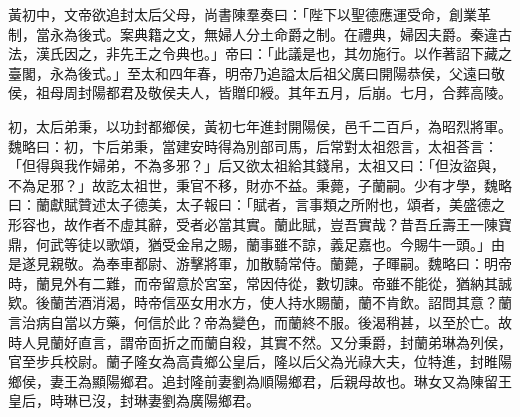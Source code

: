 \begin{pinyinscope}
黃初中，文帝欲追封太后父母，尚書陳羣奏曰：「陛下以聖德應運受命，創業革制，當永為後式。案典籍之文，無婦人分土命爵之制。在禮典，婦因夫爵。秦違古法，漢氏因之，非先王之令典也。」帝曰：「此議是也，其勿施行。以作著詔下藏之臺閣，永為後式。」至太和四年春，明帝乃追謚太后祖父廣曰開陽恭侯，父遠曰敬侯，祖母周封陽都君及敬侯夫人，皆贈印綬。其年五月，后崩。七月，合葬高陵。

初，太后弟秉，以功封都鄉侯，黃初七年進封開陽侯，邑千二百戶，為昭烈將軍。魏略曰：初，卞后弟秉，當建安時得為別部司馬，后常對太祖怨言，太祖荅言：「但得與我作婦弟，不為多邪？」后又欲太祖給其錢帛，太祖又曰：「但汝盜與，不為足邪？」故訖太祖世，秉官不移，財亦不益。秉薨，子蘭嗣。少有才學，魏略曰：蘭獻賦贊述太子德美，太子報曰：「賦者，言事類之所附也，頌者，美盛德之形容也，故作者不虛其辭，受者必當其實。蘭此賦，豈吾實哉？昔吾丘壽王一陳寶鼎，何武等徒以歌頌，猶受金帛之賜，蘭事雖不諒，義足嘉也。今賜牛一頭。」由是遂見親敬。為奉車都尉、游擊將軍，加散騎常侍。蘭薨，子暉嗣。魏略曰：明帝時，蘭見外有二難，而帝留意於宮室，常因侍從，數切諫。帝雖不能從，猶納其誠欵。後蘭苦酒消渴，時帝信巫女用水方，使人持水賜蘭，蘭不肯飲。詔問其意？蘭言治病自當以方藥，何信於此？帝為變色，而蘭終不服。後渴稍甚，以至於亡。故時人見蘭好直言，謂帝靣折之而蘭自殺，其實不然。又分秉爵，封蘭弟琳為列侯，官至步兵校尉。蘭子隆女為高貴鄉公皇后，隆以后父為光祿大夫，位特進，封睢陽鄉侯，妻王為顯陽鄉君。追封隆前妻劉為順陽鄉君，后親母故也。琳女又為陳留王皇后，時琳已沒，封琳妻劉為廣陽鄉君。


\end{pinyinscope}